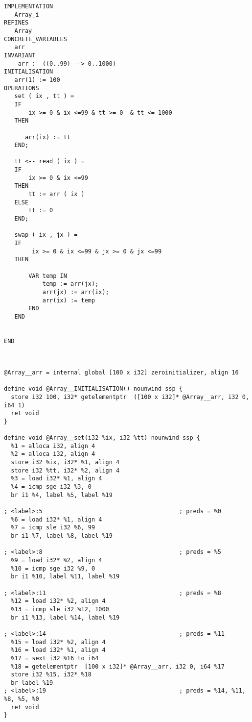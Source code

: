 \documentclass[10pt,a4paper]{article}
\begin{document}
\begin{verbatim}
IMPLEMENTATION 
   Array_i
REFINES
   Array
CONCRETE_VARIABLES
   arr
INVARIANT 
    arr :  ((0..99) --> 0..1000)
INITIALISATION
   arr(1) := 100
OPERATIONS
   set ( ix , tt ) =
   IF
       ix >= 0 & ix <=99 & tt >= 0  & tt <= 1000
   THEN
       
      arr(ix) := tt 
   END;

   tt <-- read ( ix ) =
   IF
       ix >= 0 & ix <=99
   THEN
       tt := arr ( ix )
   ELSE
       tt := 0
   END;

   swap ( ix , jx ) =
   IF
        ix >= 0 & ix <=99 & jx >= 0 & jx <=99 
   THEN

       VAR temp IN
           temp := arr(jx);
           arr(jx) := arr(ix);
           arr(ix) := temp
       END
   END


END


\end{verbatim}




\begin{verbatim}

@Array__arr = internal global [100 x i32] zeroinitializer, align 16

define void @Array__INITIALISATION() nounwind ssp {
  store i32 100, i32* getelementptr  ([100 x i32]* @Array__arr, i32 0, i64 1)
  ret void
}

define void @Array__set(i32 %ix, i32 %tt) nounwind ssp {
  %1 = alloca i32, align 4
  %2 = alloca i32, align 4
  store i32 %ix, i32* %1, align 4
  store i32 %tt, i32* %2, align 4
  %3 = load i32* %1, align 4
  %4 = icmp sge i32 %3, 0
  br i1 %4, label %5, label %19

; <label>:5                                       ; preds = %0
  %6 = load i32* %1, align 4
  %7 = icmp sle i32 %6, 99
  br i1 %7, label %8, label %19

; <label>:8                                       ; preds = %5
  %9 = load i32* %2, align 4
  %10 = icmp sge i32 %9, 0
  br i1 %10, label %11, label %19

; <label>:11                                      ; preds = %8
  %12 = load i32* %2, align 4
  %13 = icmp sle i32 %12, 1000
  br i1 %13, label %14, label %19

; <label>:14                                      ; preds = %11
  %15 = load i32* %2, align 4
  %16 = load i32* %1, align 4
  %17 = sext i32 %16 to i64
  %18 = getelementptr  [100 x i32]* @Array__arr, i32 0, i64 %17
  store i32 %15, i32* %18
  br label %19
; <label>:19                                      ; preds = %14, %11, %8, %5, %0
  ret void
}
\end{verbatim}
\end{document}
